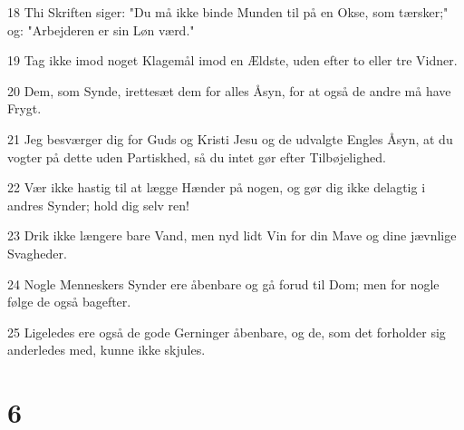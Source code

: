 \par 18 Thi Skriften siger: "Du må ikke binde Munden til på en Okse, som tærsker;" og: "Arbejderen er sin Løn værd."
\par 19 Tag ikke imod noget Klagemål imod en Ældste, uden efter to eller tre Vidner.
\par 20 Dem, som Synde, irettesæt dem for alles Åsyn, for at også de andre må have Frygt.
\par 21 Jeg besværger dig for Guds og Kristi Jesu og de udvalgte Engles Åsyn, at du vogter på dette uden Partiskhed, så du intet gør efter Tilbøjelighed.
\par 22 Vær ikke hastig til at lægge Hænder på nogen, og gør dig ikke delagtig i andres Synder; hold dig selv ren!
\par 23 Drik ikke længere bare Vand, men nyd lidt Vin for din Mave og dine jævnlige Svagheder.
\par 24 Nogle Menneskers Synder ere åbenbare og gå forud til Dom; men for nogle følge de også bagefter.
\par 25 Ligeledes ere også de gode Gerninger åbenbare, og de, som det forholder sig anderledes med, kunne ikke skjules.

\chapter{6}

